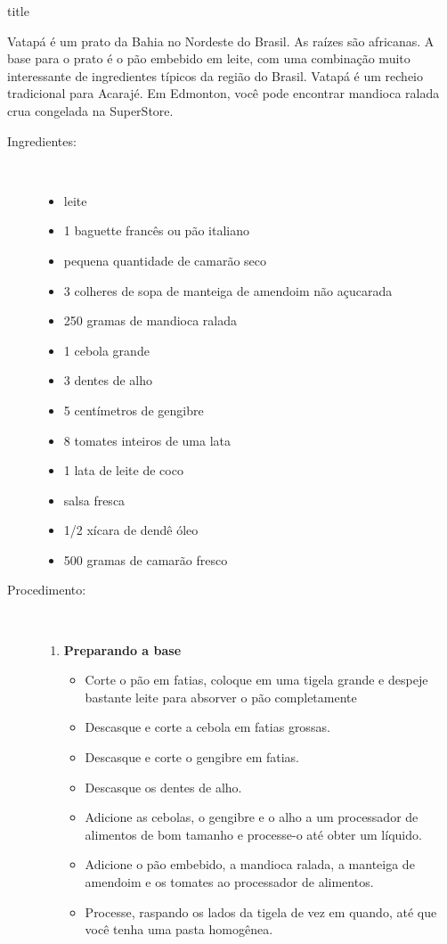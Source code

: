 \documentclass [11pt, letterpaper] {article}
\begin{document}
 {title}

Vatap\'a é um prato da Bahia no Nordeste do Brasil. As raízes são africanas. A base para o prato é o pão embebido em leite, com uma combinação muito interessante de ingredientes típicos da região do Brasil. Vatap\'a é um recheio tradicional para Acaraj\'e. Em Edmonton, você pode encontrar mandioca ralada crua congelada na SuperStore.

\vspace {0.3in}

\begin {description}

\item [Ingredientes:] \ \\
\begin {itemize}
\item leite
\item 1 baguette francês ou pão italiano
\item pequena quantidade de camarão seco
\item 3 colheres de sopa de manteiga de amendoim não açucarada
\item 250 gramas de mandioca ralada
\item 1 cebola grande
\item 3 dentes de alho
\item 5 cent\'imetros de gengibre
\item 8 tomates inteiros de uma lata
\item 1 lata de leite de coco
\item salsa fresca
\item 1/2 xícara de dend\^e óleo
\item 500 gramas de camarão fresco
\end {itemize}

\item [Procedimento:] \ \\

\begin {enumerate}
\item {\bf Preparando a base}
\begin {itemize}
\item Corte o pão em fatias, coloque em uma tigela grande e despeje bastante leite para absorver o pão completamente
\item Descasque e corte a cebola em fatias grossas.
\item Descasque e corte o gengibre em fatias.
\item Descasque os dentes de alho.
\item Adicione as cebolas, o gengibre e o alho a um processador de alimentos de bom tamanho e processe-o até obter um l\'iquido.
\item Adicione o pão embebido, a mandioca ralada, a manteiga de amendoim e os tomates ao processador de alimentos.
\item Processe, raspando os lados da tigela de vez em quando, até que você tenha uma pasta homogênea.
\end {itemize}


\end{enumerate}
\end{description}
\end{document}

